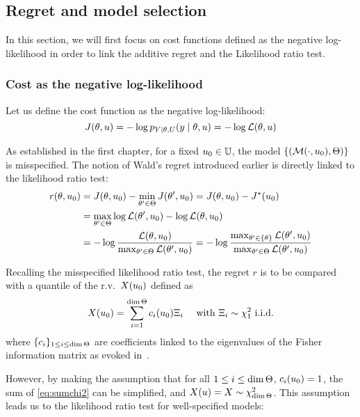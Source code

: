 \documentclass[../../Main_ManuscritThese.tex]{subfiles}
\begin{document}
\subsection{Regret and model selection}
\label{sec:regret}
In this section, we will first focus on cost functions defined as the negative log-likelihood in order to link the additive regret and the Likelihood ratio test.
\subsubsection{Cost as the negative log-likelihood}

Let us define the cost function as the negative log-likelihood:
\begin{equation}
  J(\theta, u) = - \log p_{Y\mid \theta, U}(y \mid \theta, u) = -\log \mathcal{L}(\theta,u)
\end{equation}

As established in the first chapter, for a fixed $u_0\in\mathbb{U}$, the model $\left\{\left(\mathcal{M}(\cdot, u_0), \Theta \right)\right\}$ is misspecified.
  The notion of Wald's regret introduced earlier is directly linked to the likelihood ratio test:
  \begin{align}
    r(\theta,u_0) &= J(\theta, u_0) - \min_{\theta^{\prime}\in\Theta}J(\theta^{\prime}, u_0) = J(\theta,u_0) - J^*(u_0)  \\
                 &= \max_{\theta^{\prime}\in\Theta} \log \mathcal{L}(\theta^{\prime}, u_0) - \log \mathcal{L}(\theta, u_0) \\
                 &= -\log \frac{\mathcal{L}(\theta, u_0)}{\max_{\theta^{\prime}\in\Theta}\mathcal{L}(\theta^{\prime}, u_0)} = -\log \frac{\max_{\theta^{\prime}\in\{\theta\}}\mathcal{L}(\theta^{\prime}, u_0)}{\max_{\theta^{\prime}\in\Theta}\mathcal{L}(\theta^{\prime}, u_0)}
  \end{align}

  Recalling the misspecified likelihood ratio test, the regret $r$ is to be compared with a quantile of the r.v.\ $X(u_0)$ defined as
  \begin{equation}
    \label{eq:sumchi2}
X(u_0)=\sum_{i=1}^{\dim \Theta} c_i(u_0) \Xi_i \quad \text{ with } \Xi_i \sim \chi^2_1 \text{ i.i.d.}
\end{equation}
 where $\{c_i\}_{1\leq i \leq \dim \Theta}$ are coefficients linked to the eigenvalues of the Fisher information matrix as evoked in~\label{sec:model_misspecification}.

  
 However, by making the assumption that for all $1 \leq i \leq \dim \Theta$, $c_i(u_0)=1$, the sum of \cref{eq:sumchi2} can be simplified, and $X(u) = X \sim \chi^2_{\dim \Theta}$. This assumption leads us to the likelihood ratio test for well-specified models:
\end{document}
